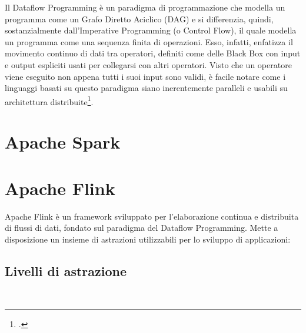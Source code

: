 Il Dataflow Programming è un paradigma di programmazione che modella un programma come un Grafo Diretto Aciclico (DAG) e si differenzia, quindi, sostanzialmente dall'Imperative Programming (o Control Flow), il quale modella un programma come una sequenza finita di operazioni. Esso, infatti, enfatizza il movimento continuo di dati tra operatori, definiti come delle Black Box con input e output espliciti usati per collegarsi con altri operatori. Visto che un operatore viene eseguito non appena tutti i suoi input sono validi, è facile notare come i linguaggi basati su questo paradigma siano inerentemente paralleli e usabili su architettura distribuite\footcite{DataflowProgramming}.

\section{Apache Spark} \label{Spark}

\section{Apache Flink}\label{Flink}

Apache Flink è un framework sviluppato per l'elaborazione continua e distribuita di flussi di dati, fondato sul paradigma del Dataflow Programming. Mette a disposizione un insieme di astrazioni utilizzabili per lo sviluppo di applicazioni:

\subsection{Livelli di astrazione}  \label{AbstractionLevels} ~\\

